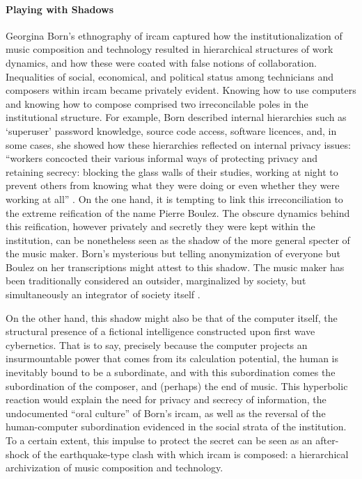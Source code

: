 \paragraph{Playing with Shadows}
Georgina Born's ethnography of \gls{ircam} \parencite{Bor95:Rat} captured how the institutionalization of music composition and technology resulted in hierarchical structures of work dynamics, and how these were coated with false notions of collaboration. Inequalities of social, economical, and political status among technicians and composers within \gls{ircam} became privately evident. Knowing how to use computers and knowing how to compose comprised two irreconcilable poles in the institutional structure. For example, Born described internal hierarchies such as `superuser' password knowledge, source code access, software licences, and, in some cases, she showed how these hierarchies reflected on internal privacy issues: ``workers concocted their various informal ways of protecting privacy and retaining secrecy: blocking the glass walls of their studies, working at night to prevent others from knowing what they were doing or even whether they were working at all'' \parencite[272]{Bor95:Rat}. On the one hand, it is tempting to link this irreconciliation to the extreme reification of the name Pierre Boulez. The obscure dynamics behind this reification, however privately and secretly they were kept within the institution, can be nonetheless seen as the shadow of the more general specter of the music maker. Born's mysterious but telling anonymization of everyone but Boulez on her transcriptions might attest to this shadow. The music maker has been traditionally considered an outsider, marginalized by society, but simultaneously an integrator of society itself \parencite[12]{Att77:Noi}. 

On the other hand, this shadow might also be that of the computer itself, the structural presence of a fictional intelligence constructed upon first wave cybernetics. That is to say, precisely because the computer projects an insurmountable power that comes from its calculation potential, the human is inevitably bound to be a subordinate, and with this subordination comes the subordination of the composer, and (perhaps) the end of music. This hyperbolic reaction would explain the need for privacy and secrecy of information, the undocumented ``oral culture'' of Born's \gls{ircam}, as well as the reversal of the human-computer subordination evidenced in the social strata of the institution. To a certain extent, this impulse to protect the secret can be seen as an after-shock of the earthquake-type clash with which \gls{ircam} is composed: a hierarchical archivization of music composition and technology.

